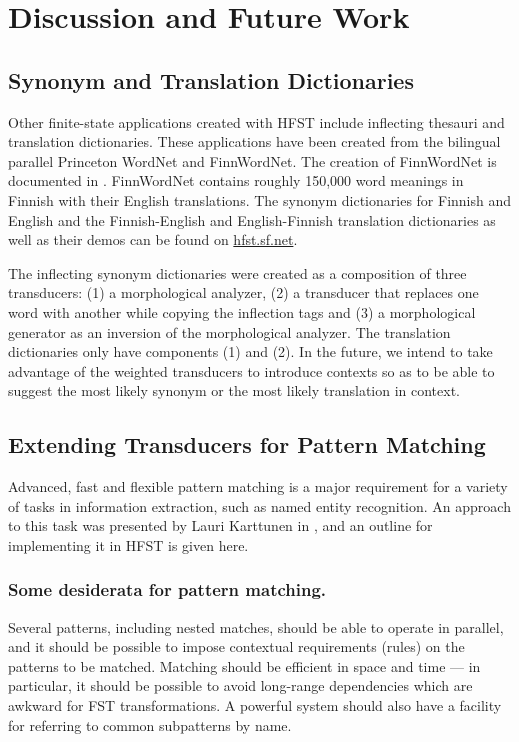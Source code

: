 \documentclass{llncs}
\begin{document}
\section{Discussion and Future Work}\label{Discussion}

\subsection{Synonym and Translation Dictionaries}

Other finite-state applications created with HFST include inflecting thesauri and translation dictionaries.
These applications have been created from the bilingual parallel Princeton WordNet and FinnWordNet. 
The creation of FinnWordNet is documented in \cite{linden/2010}. FinnWordNet contains roughly 150,000 
word meanings in Finnish with their English translations. The synonym dictionaries for Finnish and English and the Finnish-English and English-Finnish translation dictionaries as well as their demos can be found on \url{hfst.sf.net}.

The inflecting synonym dictionaries were created as a composition of three transducers: (1) a morphological analyzer, (2) a transducer that replaces one word with another while copying the inflection tags and (3) a morphological generator as an inversion of the morphological analyzer. The translation dictionaries only have components (1) and (2). In the future, we intend to take advantage of the weighted transducers to introduce contexts so as to be able to suggest the most likely synonym or the most likely translation in context.

\subsection{Extending Transducers for Pattern Matching}

Advanced, fast and flexible pattern matching is a major requirement for a
variety of tasks in information extraction, such as named entity recognition.
An approach to this task was presented by Lauri Karttunen in
\cite{karttunen/2011}, and an outline for implementing it in HFST is given here.

\subsubsection{Some desiderata for pattern matching.} Several patterns,
including nested matches, should be able to operate in parallel, and
it should be possible to impose contextual requirements (rules) on
the patterns to be matched. Matching should be efficient in space and
time --- in particular, it should be possible to avoid long-range
dependencies which are awkward for FST transformations.
A powerful system should also have a facility for referring
to common subpatterns by name.
\end{document}
